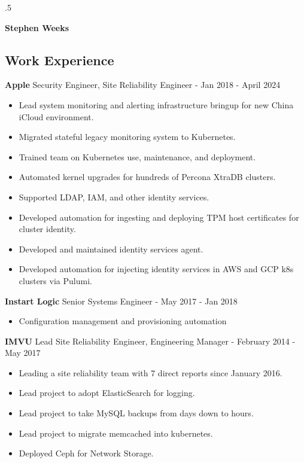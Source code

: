 \documentclass[line]{res}
\begin{document}
\moveleft.5\hoffset\centerline{\Huge\textbf{Stephen Weeks}}

\address{408.702.4448 tene@allalone.org}

\begin{resume}

\section{Work Experience}
\textbf{Apple} Security Engineer, Site Reliability Engineer - Jan 2018 - April 2024
\begin{itemize}
\item Lead system monitoring and alerting infrastructure bringup for new China iCloud environment.
\item Migrated stateful legacy monitoring system to Kubernetes.
\item Trained team on Kubernetes use, maintenance, and deployment.
\item Automated kernel upgrades for hundreds of Percona XtraDB clusters.
\item Supported LDAP, IAM, and other identity services.
\item Developed automation for ingesting and deploying TPM host certificates for cluster identity.
\item Developed and maintained identity services agent.
\item Developed automation for injecting identity services in AWS and GCP k8s clusters via Pulumi.
\end{itemize}

\textbf{Instart Logic} Senior Systems Engineer - May 2017 - Jan 2018
\begin{itemize}
\item Configuration management and provisioning automation
\end{itemize}

\textbf{IMVU} Lead Site Reliability Engineer, Engineering Manager - February 2014 - May 2017
\begin{itemize}
\item Leading a site reliability team with 7 direct reports since January 2016.
\item Lead project to adopt ElasticSearch for logging.
\item Lead project to take MySQL backups from days down to hours.
\item Lead project to migrate memcached into kubernetes.
\item Deployed Ceph for Network Storage.
\end{itemize}


\end{resume}
\end{document}
